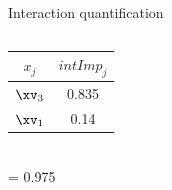 \begin{frame}{Interaction quantification}
\begin{columns}[T, totalwidth=\textwidth]
\begin{column}{0.52\textwidth}
        
     \vspace{-200px}
        \scriptsize
     \hspace{130px}
     \setlength{\tabcolsep}{1pt}
     \begin{tabular}{|c|c|}
        \hline
           $x_j$ & $intImp_j$  \\\hline
           \rowcolor{ForestGreen!70}
            $\xv_3$     & 0.835 \\
            \rowcolor{YellowGreen!50}
            $\xv_1$     &  0.14\\\hline
        \end{tabular}\\
     \hspace{138px}= 0.975
    
        \end{column}
    \end{columns}
    
    \end{frame}
    
    
    
    
    

